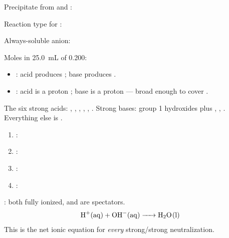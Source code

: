 \documentclass{apchem-notes}
\begin{document}

\begin{warmup}[4]
  \item Precipitate from  and :
  \item Reaction type for :
  \item Always-soluble anion: 
  \item Moles in \SI{25.0}{\milli\liter} of \SI{0.200}{\Molar}:
\end{warmup}



\begin{itemize}[leftmargin=*,itemsep=0.25em]
  \item {}: acid produces ;
        base produces .
  \item {}: acid is a proton
        ; base is a proton
         --- broad enough to cover .
\end{itemize}

The six strong acids: , , , ,
, . Strong bases: group 1
hydroxides plus , , . Everything else is
.


\begin{enumerate}[leftmargin=*,itemsep=0.3em]
  \item {}: 
  \item {}: 
  \item {}: 
  \item {}: 
\end{enumerate}



\begin{workedexample}
: both fully ionized,  and  are
spectators.
\[ \ce{H+(aq) + OH^-(aq) -> H2O(l)} \]
This is the net ionic equation for \emph{every} strong/strong
neutralization.
\end{workedexample}
\end{document}
